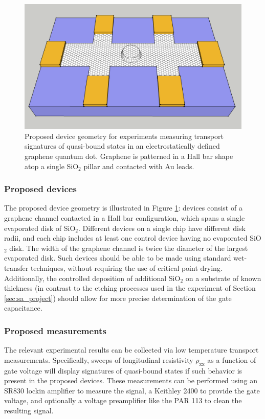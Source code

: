 \documentclass[edeposit,fullpage,draftthesis]{uiucthesis2009}
\begin{document}
        
        \begin{figure}
            \centering
            \includegraphics[width=0.4\columnwidth]{images/futurework/ProposedDevice1_crop}
            \caption[Proposed device geometry for quasi-bound state experiments]{
            Proposed device geometry for experiments measuring transport signatures of
            quasi-bound states in an electrostatically defined graphene quantum dot. Graphene is patterned in a 
            Hall bar shape atop a single SiO$_2$ pillar and contacted with Au leads.
            }
            \label{fig:propdev1}
        \end{figure}
            
        \subsubsection*{Proposed devices}
        
            The proposed device geometry is illustrated in Figure \ref{fig:propdev1}: devices consist of 
            a graphene channel contacted in a Hall bar configuration, which
            spans a single evaporated disk of SiO$_2$. Different devices on a single chip
            have different disk radii, and each chip includes at least one control device
            having no evaporated SiO$_2$ disk. The width of the graphene channel is twice
            the diameter of the largest evaporated disk. Such devices should be able to
            be made using standard wet-transfer techniques, without requiring the use of
            critical point drying.
            Additionally, the controlled deposition of additional SiO$_2$ on a substrate of known thickness
            (in contrast to the etching processes used in the experiment of Section \ref{sec:sa_project})
            should allow for more precise determination of the gate capacitance.
        
        \subsubsection*{Proposed measurements}
        
            The relevant experimental results can be collected via low temperature transport
            measurements. Specifically, sweeps of longitudinal resistivity $\rho_\text{xx}$
            as a function of gate voltage will display signatures of 
            quasi-bound states if such behavior is present in the proposed devices. 
            These measurements can be performed using an SR830 lockin amplifier to measure the signal,
            a Keithley 2400 to provide the gate voltage, and optionally a voltage preamplifier
            like the PAR 113 to clean the resulting signal.
            
\end{document}
